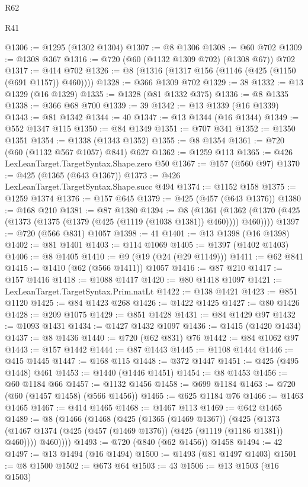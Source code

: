\begin{lexlean}{R62}
\begin{lexlean}{R41}
\begin{coremodule}
{{{{{{{{{{{{{{{{{{{{{{{{{{{{{{{{{{{{{{{{{{{{{{{{{{{{{{{{{{{{{{{{{{{{{{{{{{{{{{{{{{{{{{{@1306 := @1295 (@1302 @1304)
@1307 := @8 @1306
@1308 := @60 @702
@1309 := @1308 @367
@1316 := @720 (@60 (@1132 @1309 @702) (@1308 @67)) @702
@1317 := @414 @702
@1326 := @8 (@1316 (@1317 @156 (@1146 (@425 (@1150 (@691 @1157)) @460))))
@1328 := @366 @1309 @702
@1329 := 38
@1332 := @13 @1329 (@16 @1329)
@1335 := @1328 (@81 @1332 @375)
@1336 := @8 @1335
@1338 := @366 @68 @700
@1339 := 39
@1342 := @13 @1339 (@16 @1339)
@1343 := @81 @1342
@1344 := 40
@1347 := @13 @1344 (@16 @1344)
@1349 := @552 @1347 @115
@1350 := @84 @1349
@1351 := @707 @341
@1352 := @1350 @1351
@1354 := @1338 (@1343 @1352)
@1355 := @8 @1354
@1361 := @720 (@60 (@1132 @567 @1057) @841) @627
@1362 := @1259 @113
@1365 := @426 LexLeanTarget.TargetSyntax.Shape.zero @50
@1367 := @157 (@560 @97)
@1370 := @425 (@1365 (@643 @1367))
@1373 := @426 LexLeanTarget.TargetSyntax.Shape.succ @494
@1374 := @1152 @158
@1375 := @1259 @1374
@1376 := @157 @645
@1379 := @425 (@457 (@643 @1376))
@1380 := @168 @210
@1381 := @87 @1380
@1394 := @8
    (@1361 (@1362 (@1370 (@425 (@1373 (@1375 (@1379 (@425 (@1119 (@1038 @1381)) @460)))) @460))))
@1397 := @720 (@566 @831) @1057
@1398 := 41
@1401 := @13 @1398 (@16 @1398)
@1402 := @81 @1401
@1403 := @114 @1069
@1405 := @1397 (@1402 @1403)
@1406 := @8 @1405
@1410 := @9 (@19 (@24 (@29 @1149)))
@1411 := @62 @841
@1415 := @1410 (@62 (@566 @1411)) @1057
@1416 := @87 @210
@1417 := @157 @1416
@1418 := @1088 @1417
@1420 := @80 @1418 @1097
@1421 := LexLeanTarget.TargetSyntax.Prim.natLt
@1422 := @138 @1421
@1423 := @851 @1120
@1425 := @84 @1423 @268
@1426 := @1422 @1425
@1427 := @80 @1426
@1428 := @209 @1075
@1429 := @851 @1428
@1431 := @84 @1429 @97
@1432 := @1093 @1431
@1434 := @1427 @1432 @1097
@1436 := @1415 (@1420 @1434)
@1437 := @8 @1436
@1440 := @720 (@62 @831) @76
@1442 := @84 @1062 @97
@1443 := @157 @1442
@1444 := @87 @1443
@1445 := @1108 @1444
@1446 := @415 @1445
@1447 := @168 @115
@1448 := @372 @1447
@1451 := @425 (@495 @1448) @461
@1453 := @1440 (@1446 @1451)
@1454 := @8 @1453
@1456 := @60 @1184 @66
@1457 := @1132 @1456
@1458 := @699 @1184
@1463 := @720 (@60 (@1457 @1458) (@566 @1456))
@1465 := @625 @1184 @76
@1466 := @1463 @1465
@1467 := @414 @1465
@1468 := @1467 @113
@1469 := @642 @1465
@1489 := @8
    (@1466
      (@1468
        (@425
          (@1365 (@1469 @1367))
          (@425
            (@1373 (@1467 @1374 (@425 (@457 (@1469 @1376)) (@425 (@1119 (@1186 @1381)) @460))))
            @460))))
@1493 := @720 (@840 (@62 @1456)) @1458
@1494 := 42
@1497 := @13 @1494 (@16 @1494)
@1500 := @1493 (@81 @1497 @1403)
@1501 := @8 @1500
@1502 := @673 @64
@1503 := 43
@1506 := @13 @1503 (@16 @1503)
}}}}}}}}}}}}}}}}}}}}}}}}}}}}}}}}}}}}}}}}}}}}}}}}}}}}}}}}}}}}}}}}}}}}}}}}}}}}}}}}}}}}}}}
\end{coremodule}
\end{lexlean}
\end{lexlean}
